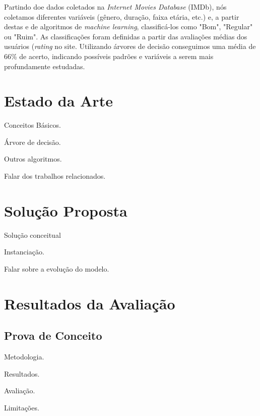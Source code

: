 \documentclass[twoside]{article}
\begin{document}
\begin{multicols}{2}
Partindo doe dados coletados na \textit{Internet Movies Database} (IMDb), nós coletamos diferentes variáveis (gênero, duração, faixa etária, etc.) e, a partir destas e de algoritmos de \textit{machine learning}, classificá-los como "Bom", "Regular" ou "Ruim". As classificações foram definidas a partir das avaliações médias dos usuários (\textit{rating} no site. Utilizando árvores de decisão conseguimos uma média de 66\% de acerto, indicando possíveis padrões e variáveis a serem mais profundamente estudadas.


\section{Estado da Arte}

Conceitos Básicos.
\begin{compactitem}
\item Árvore de decisão.
\item Outros algoritmos.
\end{compactitem}
Falar dos trabalhos relacionados.


\section{Solução Proposta}

Solução conceitual
\begin{compactitem}
\item Instanciação.
\item Falar sobre a evolução do modelo.
\end{compactitem}


\section{Resultados da Avaliação}

\subsection{Prova de Conceito}

Metodologia.

Resultados.

Avaliação.

Limitações.


\end{multicols}
\end{document}
